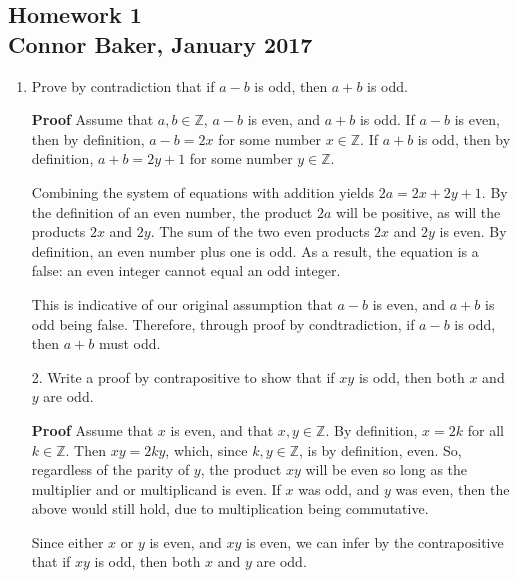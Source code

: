 \documentclass[12pt]{article}
\begin{document}
\begin{center}
\subsection*{Homework 1\\Connor Baker, January 2017}
\end{center}

\begin{enumerate}
\item Prove by contradiction that if $a-b$ is odd, then $a+b$ is odd.
\end{enumerate}

\begin{enumerate}
  \item[\textbf{Proof}] Assume that $a,b\in\mathbb{Z}$, $a-b$ is even, and $a+b$ is odd. If $a-b$ is even, then by definition, $a-b=2x$ for some number $x\in\mathbb{Z}$. If $a+b$ is odd, then by definition, $a+b=2y+1$ for some number $y\in\mathbb{Z}$.
  \item[] Combining the system of equations with addition yields $2a=2x+2y+1$. By the definition of an even number, the product $2a$ will be positive, as will the products $2x$ and $2y$. The sum of the two even products $2x$ and $2y$ is even. By definition, an even number plus one is odd. As a result, the equation is a false: an even integer cannot equal an odd integer.
  \item[] This is indicative of our original assumption that $a-b$ is even, and $a+b$ is odd being false. Therefore, through proof by condtradiction, if $a-b$ is odd, then $a+b$ must odd.
\end{enumerate}

\begin{enumerate}
\item[2.] Write a proof by contrapositive to show that if $xy$ is odd, then both $x$ and $y$ are odd.
\end{enumerate}

\begin{enumerate}
  \item[\textbf{Proof}] Assume that $x$ is even, and that $x,y\in\mathbb{Z}$. By definition, $x=2k$ for all $k\in\mathbb{Z}$. Then $xy=2ky$, which, since $k,y\in\mathbb{Z}$, is by definition, even. So, regardless of the parity of $y$, the product $xy$ will be even so long as the multiplier and or multiplicand is even. If $x$ was odd, and $y$ was even, then the above would still hold, due to multiplication being commutative.
  \item[] Since either $x$ or $y$ is even, and $xy$ is even, we can infer by the contrapositive that if $xy$ is odd, then both $x$ and $y$ are odd.
\end{enumerate}
\end{document}
